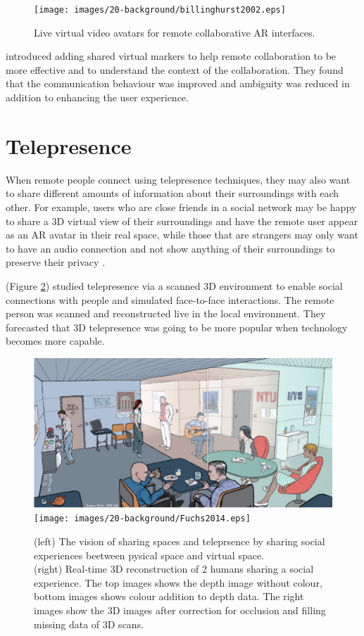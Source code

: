 \begin{figure}
    \centering
    \texttt{[image: images/20-background/billinghurst2002.eps]}
    \caption{Live virtual video avatars for remote collaborative AR interfaces. \cite{Billinghurst2002}}
    \label{fig:Billinghurst2002}
\end{figure}

\textcite{Muller2017} introduced adding shared virtual markers to help remote collaboration to be more effective and to understand the context of the collaboration. They found that the communication behaviour was improved and ambiguity was reduced in addition to enhancing the user experience. 

\section{Telepresence}      %

When remote people connect using telepresence techniques, they may also want to share different amounts of information about their surroundings with each other. For example, users who are close friends in a social network may be happy to share a 3D virtual view of their surroundings and have the remote user appear as an AR avatar in their real space, while those that are strangers may only want to have an audio connection and not show anything of their surroundings to preserve their privacy \cite{Oetzel2011}. 

\textcite{Fuchs2014} (Figure \ref{fig:Fuchs2014}) studied telepresence via a scanned 3D environment to enable social connections with people and simulated face-to-face interactions. The remote person was scanned and reconstructed live in the local environment. They forecasted that 3D telepresence was going to be more popular when technology becomes more capable.

\begin{figure}
    \centering
    \includegraphics[width=0.6\linewidth]{images/20-background/fuchs2014_2.eps}
    \texttt{[image: images/20-background/Fuchs2014.eps]}
    \caption{(left) The vision of sharing spaces and teleprsence by sharing social experiences beetween pysical space and virtual space. \\
    (right) Real-time 3D reconstruction of 2 humans sharing a social experience. The top images shows the depth image without colour, bottom images shows colour addition to depth data. The right images show the 3D images after correction for occlusion and filling missing data of 3D scans. \cite{Fuchs2014}}
    \label{fig:Fuchs2014}
\end{figure}


